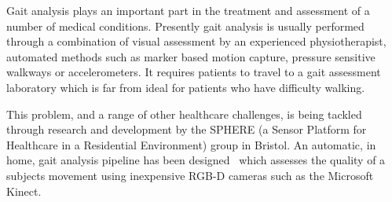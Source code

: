 \documentclass[11pt]{article} %
\begin{document}

Gait analysis plays an important part in the treatment and assessment of a number of medical conditions. Presently gait analysis is usually performed through a combination of visual assessment by an experienced physiotherapist, automated methods such as marker based motion capture, pressure sensitive walkways or accelerometers. It requires patients to travel to a gait assessment laboratory which is far from ideal for patients who have difficulty walking. 

This problem, and a range of other healthcare challenges, is being tackled through research and development by the SPHERE (a Sensor Platform for Healthcare in a Residential Environment) group in Bristol. An automatic, in home, gait analysis pipeline has been designed~\cite{Paiement} which assesses the quality of a subjects movement using inexpensive RGB-D cameras such as the Microsoft Kinect.
\end{document}
